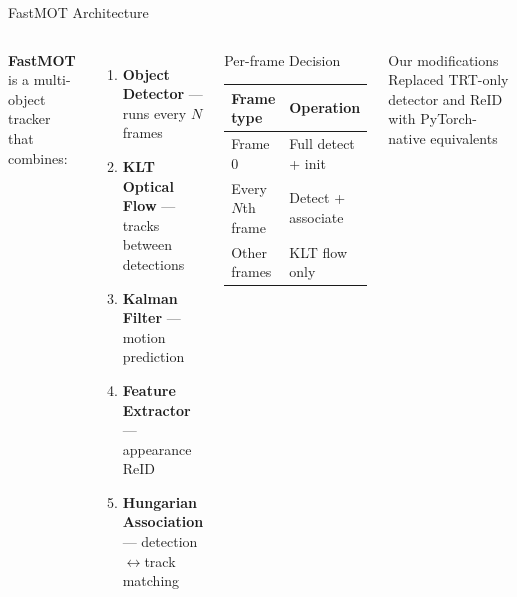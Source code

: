 \documentclass[aspectratio=169]{beamer}
\begin{document}
\begin{frame}{FastMOT Architecture}
\begin{columns}[T]
\textbf{FastMOT} is a multi-object tracker that combines:
\begin{enumerate}
  \item \textbf{Object Detector} — runs every $N$ frames
  \item \textbf{KLT Optical Flow} — tracks between detections
  \item \textbf{Kalman Filter} — motion prediction
  \item \textbf{Feature Extractor} — appearance ReID
  \item \textbf{Hungarian Association} — detection$\leftrightarrow$track matching
\end{enumerate}

\begin{block}{Per-frame Decision}
\small
\begin{tabular}{ll}
\toprule
Frame type & Operation \\
\midrule
Frame 0          & Full detect + init  \\
Every $N$th frame & Detect + associate  \\
Other frames      & KLT flow only       \\
\bottomrule
\end{tabular}
\end{block}

\begin{alertblock}{Our modifications}
\small Replaced TRT-only detector and ReID with
PyTorch-native equivalents
\end{alertblock}

\end{columns}
\end{frame}
\end{document}
